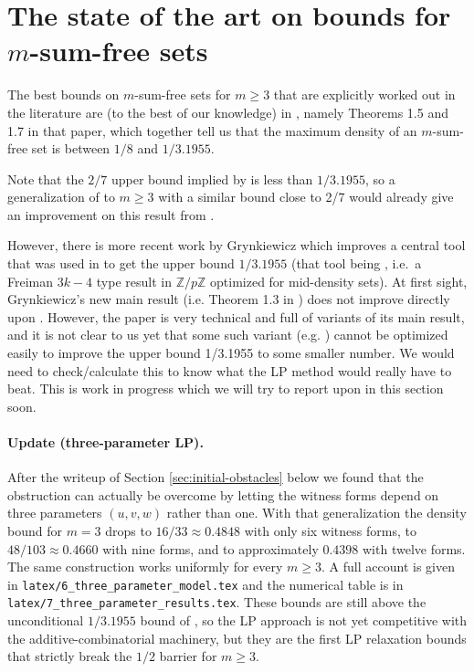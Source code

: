 \documentclass[a4paper,12pt,reqno]{amsart}
\newcommand{\1}{\mathbf{1}}
\newcommand{\0}{\mathbf{0}}
\theoremstyle{definition}
\newcommand{\mb}{\mathbb}
\begin{document}
\section{The state of the art on bounds for $m$-sum-free sets}

The best bounds on $m$-sum-free sets for $m\geq 3$ that are explicitly worked out in the literature are (to the best of our knowledge) in \cite{CGG}, namely Theorems 1.5 and 1.7 in that paper, which together tell us that the maximum density of an $m$-sum-free set is between $1/8$ and $1/3.1955$. 

Note that the $2/7$ upper bound implied by \cite[Theorem 1]{LMPV} is less than $1/3.1955$, so a generalization of \cite[Theorem 1]{LMPV} to $m\geq 3$ with a similar bound close to 2/7 would already give an improvement on this result from \cite{CGG}. 

However, there is more recent work \cite{Gryn} by Grynkiewicz which improves a central tool that was used in \cite{CGG} to get the upper bound $1/3.1955$ (that tool being \cite[Theorem 1.4]{CGG}, i.e.\ a Freiman $3k-4$ type result in $\mb{Z}/p\mb{Z}$ optimized for mid-density sets). At first sight, Grynkiewicz's new main result (i.e. Theorem 1.3 in \cite{Gryn}) does not improve directly upon \cite[Theorem 1.4]{CGG}. However, the paper \cite{Gryn} is very technical and full of variants of its main result, and it is not clear to us yet that some such variant (e.g. \cite[Theorem 3.3]{Gryn}) cannot be optimized easily to improve the upper bound 1/3.1955 to some smaller number. We would need to check/calculate this to know what the LP method would really have to beat. This is work in progress which we will try to report upon in this section soon.

\bigskip

\paragraph{Update (three-parameter LP).}
After the writeup of Section \ref{sec:initial-obstacles} below we found that
the obstruction can actually be overcome by letting the witness forms depend
on three parameters $(u,v,w)$ rather than one. With that generalization the
density bound for $m=3$ drops to $16/33\approx 0.4848$ with only six witness
forms, to $48/103\approx 0.4660$ with nine forms, and to approximately
$0.4398$ with twelve forms. The same construction works uniformly for every
$m\ge 3$. A full account is given in \texttt{latex/6\_three\_parameter\_model.tex}
and the numerical table is in \texttt{latex/7\_three\_parameter\_results.tex}.
These bounds are still above the unconditional $1/3.1955$ bound of
\cite{CGG}, so the LP approach is not yet competitive with the
additive-combinatorial machinery, but they are the first LP relaxation bounds
that strictly break the $1/2$ barrier for $m\ge 3$.
\end{document}
